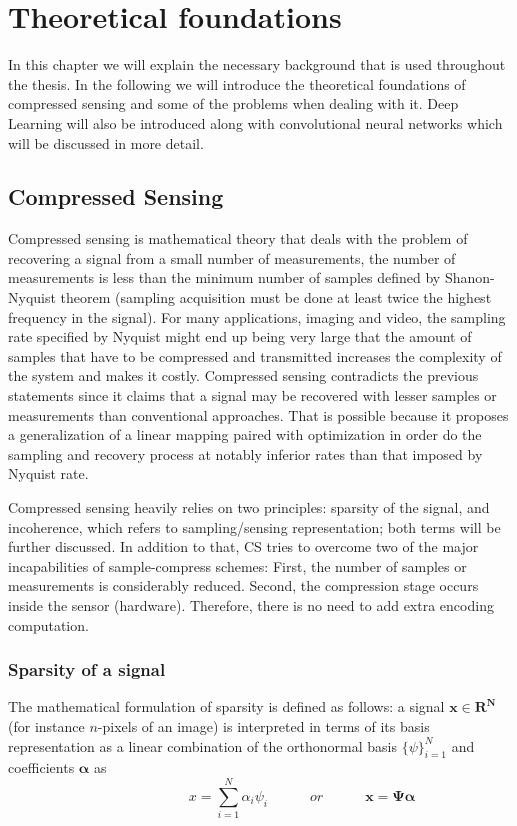 \chapter{Theoretical foundations}
In this chapter we will explain the necessary background that is used throughout the thesis. In the following we will introduce the theoretical foundations of compressed sensing and some of the problems when dealing with it. Deep Learning will also be introduced along with convolutional neural networks which will be discussed in more detail.  

\section{Compressed Sensing}

Compressed sensing is mathematical theory that deals with the problem of recovering a signal from a small number of measurements, the number of measurements is less than the minimum number of samples defined by Shanon-Nyquist theorem (sampling acquisition must be done at least twice the highest frequency in the signal). For many applications, imaging and video, the sampling rate specified by Nyquist might end up being very large that the amount of samples that have to be compressed and transmitted increases the complexity of the system and makes it costly. Compressed sensing contradicts the previous statements since it claims that a signal may be recovered with lesser samples or measurements than conventional approaches. That is possible because it proposes a generalization of a linear mapping paired with optimization in order do the sampling and recovery process at notably inferior rates than that imposed by Nyquist rate. \

Compressed sensing heavily relies on two principles: sparsity of the signal, and incoherence, which refers to sampling/sensing representation; both terms will be further discussed. In addition to that, CS tries to overcome two of the major incapabilities of sample-compress schemes: First, the number of samples or measurements is considerably reduced. Second, the compression stage occurs inside the sensor (hardware). Therefore, there is no need to add extra encoding computation.

\subsection{Sparsity of a signal}
The mathematical formulation of sparsity is defined as follows: a signal $\mathbf{x \in R^N}$ (for instance $n$-pixels of an image) is interpreted in terms of its basis representation as a linear combination of the orthonormal basis $\{\psi\}_{i=1}^{N}$ and coefficients $\mathbf{\alpha}$ as  
\begin{equation} \label{eq:signal}
\hspace{3em} \hspace{3em} x = \sum\limits_{i=1}^N \alpha_{i} \psi_{i} \hspace{3em} or \hspace{3em} \mathbf{x = \Psi \alpha}
\end{equation} 

